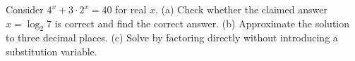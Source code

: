 Consider $4^x+3\cdot2^x=40$ for real $x$. (a) Check whether the claimed answer $x=\log_2 7$ is correct and find the correct answer. (b) Approximate the solution to three decimal places. (c) Solve by factoring directly without introducing a substitution variable.
